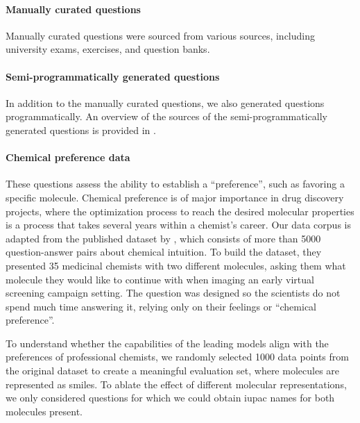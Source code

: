 \documentclass[11pt, oneside]{article}
\begin{document}
\begin{refsection}
\paragraph{Manually curated questions}
Manually curated questions were sourced from various sources, including university exams, exercises, and question banks.



\paragraph{Semi-programmatically generated questions}
In addition to the manually curated questions, we also generated questions programmatically. An overview of the sources of the semi-programmatically generated questions is provided in .



\paragraph{Chemical preference data}

These questions assess the ability to establish a \enquote{preference}, such as favoring a specific molecule. Chemical preference is of major importance in drug discovery projects, where the optimization process to reach the desired molecular properties is a process that takes several years within a chemist's career.
Our data corpus is adapted from the published dataset by \textcite{Choung_2023}, which consists of more than 5000 question-answer pairs about chemical intuition. To build the dataset, they presented 35 medicinal chemists with two different molecules, asking them what molecule they would like to continue with when imaging an early virtual screening campaign setting. The question was designed so the scientists do not spend much time answering it, relying only on their feelings or \enquote{chemical preference}.

To understand whether the capabilities of the leading models align with the preferences of professional chemists, we randomly selected 1000 data points from the original dataset to create a meaningful evaluation set, where molecules are represented as \gls{smiles}.
To ablate the effect of different molecular representations, we only considered questions for which we could obtain \gls{iupac} names for both molecules present.



\end{refsection}
\end{document}
